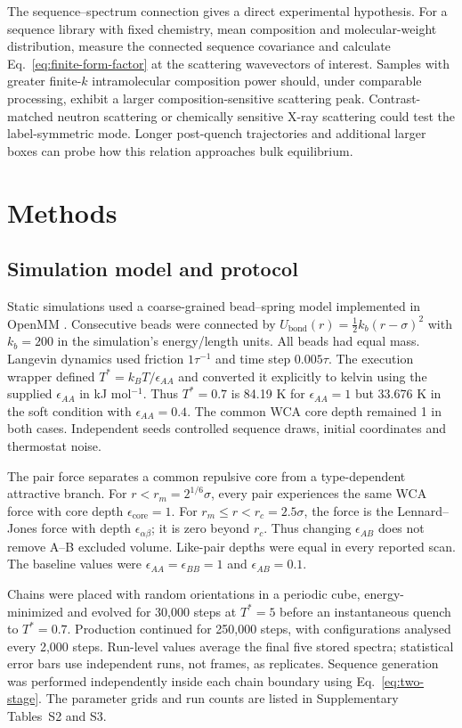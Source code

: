 \documentclass[pdflatex,sn-nature,onecolumn]{sn-jnl}
\begin{document}
The sequence--spectrum connection gives a direct experimental hypothesis. For a sequence library with fixed chemistry, mean composition and molecular-weight distribution, measure the connected sequence covariance and calculate Eq.~\ref{eq:finite-form-factor} at the scattering wavevectors of interest. Samples with greater finite-$k$ intramolecular composition power should, under comparable processing, exhibit a larger composition-sensitive scattering peak. Contrast-matched neutron scattering or chemically sensitive X-ray scattering could test the label-symmetric mode. Longer post-quench trajectories and additional larger boxes can probe how this relation approaches bulk equilibrium.

\section{Methods}

\subsection{Simulation model and protocol}

Static simulations used a coarse-grained bead--spring model implemented in OpenMM \cite{Eastman2017}. Consecutive beads were connected by $U_{\mathrm{bond}}(r)=\tfrac12k_b(r-\sigma)^2$ with $k_b=200$ in the simulation's energy/length units. All beads had equal mass. Langevin dynamics used friction $1\tau^{-1}$ and time step $0.005\tau$. The execution wrapper defined $T^*=k_BT/\epsilon_{AA}$ and converted it explicitly to kelvin using the supplied $\epsilon_{AA}$ in kJ mol$^{-1}$. Thus $T^*=0.7$ is 84.19 K for $\epsilon_{AA}=1$ but 33.676 K in the soft condition with $\epsilon_{AA}=0.4$. The common WCA core depth remained 1 in both cases. Independent seeds controlled sequence draws, initial coordinates and thermostat noise.

The pair force separates a common repulsive core from a type-dependent attractive branch. For $r<r_m=2^{1/6}\sigma$, every pair experiences the same WCA force with core depth $\epsilon_{\mathrm{core}}=1$. For $r_m\le r<r_c=2.5\sigma$, the force is the Lennard--Jones force with depth $\epsilon_{\alpha\beta}$; it is zero beyond $r_c$. Thus changing $\epsilon_{AB}$ does not remove A--B excluded volume. Like-pair depths were equal in every reported scan. The baseline values were $\epsilon_{AA}=\epsilon_{BB}=1$ and $\epsilon_{AB}=0.1$.

Chains were placed with random orientations in a periodic cube, energy-minimized and evolved for 30,000 steps at $T^*=5$ before an instantaneous quench to $T^*=0.7$. Production continued for 250,000 steps, with configurations analysed every 2,000 steps. Run-level values average the final five stored spectra; statistical error bars use independent runs, not frames, as replicates. Sequence generation was performed independently inside each chain boundary using Eq.~\ref{eq:two-stage}. The parameter grids and run counts are listed in Supplementary Tables~S2 and S3.
\end{document}
